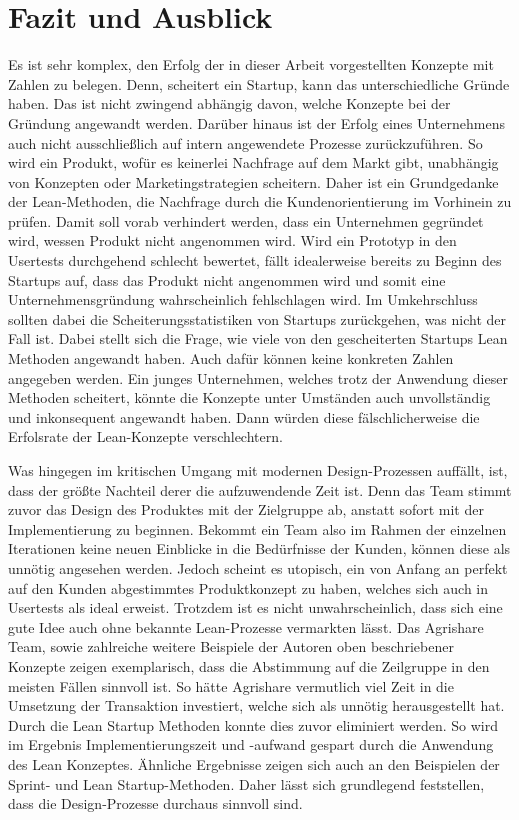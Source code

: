 \section{Fazit und Ausblick}
Es ist sehr komplex, den Erfolg der in dieser Arbeit vorgestellten Konzepte mit Zahlen zu belegen. Denn, scheitert ein Startup, kann das unterschiedliche Gründe haben. Das ist nicht zwingend abhängig davon, welche Konzepte bei der Gründung angewandt werden. Darüber hinaus ist der Erfolg eines Unternehmens auch nicht ausschließlich auf intern angewendete Prozesse zurückzuführen. So wird ein Produkt, wofür es keinerlei Nachfrage auf dem Markt gibt, unabhängig von Konzepten oder Marketingstrategien scheitern. Daher ist ein Grundgedanke der Lean-Methoden, die Nachfrage durch die Kundenorientierung im Vorhinein zu prüfen. Damit soll vorab verhindert werden, dass ein Unternehmen gegründet wird, wessen Produkt nicht angenommen wird. Wird ein Prototyp in den Usertests durchgehend schlecht bewertet, fällt idealerweise bereits zu Beginn des Startups auf, dass das Produkt nicht angenommen wird und somit eine Unternehmensgründung wahrscheinlich fehlschlagen wird. Im Umkehrschluss sollten dabei die Scheiterungsstatistiken von Startups zurückgehen, was nicht der Fall ist. Dabei stellt sich die Frage, wie viele von den gescheiterten Startups Lean Methoden angewandt haben. Auch dafür können keine konkreten Zahlen angegeben werden. Ein junges Unternehmen, welches trotz der Anwendung dieser Methoden scheitert, könnte die Konzepte unter Umständen auch unvollständig und inkonsequent angewandt haben. Dann würden diese fälschlicherweise die Erfolsrate der Lean-Konzepte verschlechtern. 

Was hingegen im kritischen Umgang mit modernen Design-Prozessen auffällt, ist, dass der größte Nachteil derer die aufzuwendende Zeit ist. Denn das Team stimmt zuvor das Design des Produktes mit der Zielgruppe ab, anstatt sofort mit der Implementierung zu beginnen. Bekommt ein Team also im Rahmen der einzelnen Iterationen keine neuen Einblicke in die Bedürfnisse der Kunden, können diese als unnötig angesehen werden. Jedoch scheint es utopisch, ein von Anfang an perfekt auf den Kunden abgestimmtes Produktkonzept zu haben, welches sich auch in Usertests als ideal erweist. Trotzdem ist es nicht unwahrscheinlich, dass sich eine gute Idee auch ohne bekannte Lean-Prozesse vermarkten lässt. Das Agrishare Team, sowie zahlreiche weitere Beispiele der Autoren oben beschriebener Konzepte zeigen exemplarisch, dass die Abstimmung auf die Zeilgruppe in den meisten Fällen sinnvoll ist. So hätte Agrishare vermutlich viel Zeit in die Umsetzung der Transaktion investiert, welche sich als unnötig herausgestellt hat. Durch die Lean Startup Methoden konnte dies zuvor eliminiert werden. So wird im Ergebnis Implementierungszeit und -aufwand gespart durch die Anwendung des Lean Konzeptes. Ähnliche Ergebnisse zeigen sich auch an den Beispielen der Sprint- und Lean Startup-Methoden. Daher lässt sich grundlegend feststellen, dass die Design-Prozesse durchaus sinnvoll sind.

